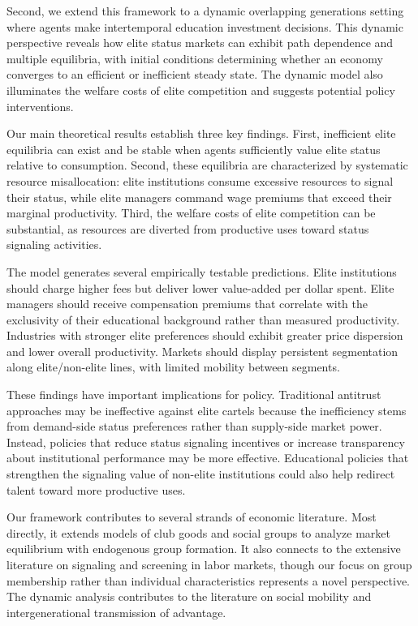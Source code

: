 \documentclass[12pt,letterpaper]{article}
\begin{document}
	Second, we extend this framework to a dynamic overlapping generations setting where agents make intertemporal education investment decisions. This dynamic perspective reveals how elite status markets can exhibit path dependence and multiple equilibria, with initial conditions determining whether an economy converges to an efficient or inefficient steady state. The dynamic model also illuminates the welfare costs of elite competition and suggests potential policy interventions.
	
	Our main theoretical results establish three key findings. First, inefficient elite equilibria can exist and be stable when agents sufficiently value elite status relative to consumption. Second, these equilibria are characterized by systematic resource misallocation: elite institutions consume excessive resources to signal their status, while elite managers command wage premiums that exceed their marginal productivity. Third, the welfare costs of elite competition can be substantial, as resources are diverted from productive uses toward status signaling activities.
	
	The model generates several empirically testable predictions. Elite institutions should charge higher fees but deliver lower value-added per dollar spent. Elite managers should receive compensation premiums that correlate with the exclusivity of their educational background rather than measured productivity. Industries with stronger elite preferences should exhibit greater price dispersion and lower overall productivity. Markets should display persistent segmentation along elite/non-elite lines, with limited mobility between segments.
	
	These findings have important implications for policy. Traditional antitrust approaches may be ineffective against elite cartels because the inefficiency stems from demand-side status preferences rather than supply-side market power. Instead, policies that reduce status signaling incentives or increase transparency about institutional performance may be more effective. Educational policies that strengthen the signaling value of non-elite institutions could also help redirect talent toward more productive uses.
	
	Our framework contributes to several strands of economic literature. Most directly, it extends models of club goods and social groups to analyze market equilibrium with endogenous group formation. It also connects to the extensive literature on signaling and screening in labor markets, though our focus on group membership rather than individual characteristics represents a novel perspective. The dynamic analysis contributes to the literature on social mobility and intergenerational transmission of advantage.
	
\end{document}

